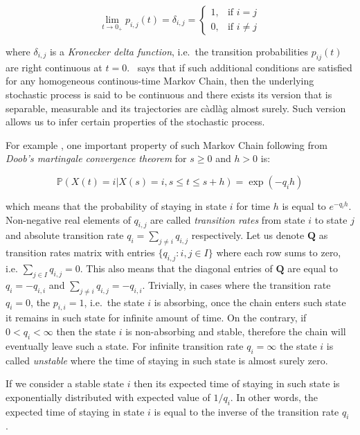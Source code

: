 \begin{equation}
    \lim_{t \to 0_{+}} p_{i,j}(t) = \delta_{i,j} = 
        \begin{cases}
            1, & \text{if } i = j\\
            0, & \text{if } i \neq j
        \end{cases}
\end{equation}

where $\delta_{i,j}$ is a \textit{Kronecker delta function}, i.e.\ the transition probabilities $p_{ij}(t)$ are right continuous at $t=0$.~\citep{Norris2012} says that if such additional conditions are satisfied for any homogeneous continous-time Markov Chain, 
then the underlying stochastic process is said to be continuous and there exists its version that is separable, measurable and its trajectories are càdlàg almost surely. Such version allows us to infer 
certain properties of the stochastic process.

For example \citep{Gidi2018}, one important property of such Markov Chain following from \textit{Doob's martingale convergence theorem} for $s \geq 0$ and $h>0$ is:

\begin{equation}
    \mathbb{P}(X(t) = i|X(s)=i, s \leq t \leq s+h) = \exp(-{q_i}h)
\end{equation}

which means that the probability of staying in state $i$ for time $h$ is equal to $e^{-{q_i}h}$. 
Non-negative real elements of $q_{i,j}$ are called \textit{transition rates} from state $i$ to state $j$ and absolute transition 
rate $q_i = \sum_{j \neq i} q_{i,j}$ respectively. Let us denote $\textbf{Q}$ as transition rates matrix with entries $\{q_{i,j}: i,j \in I\}$ where each row sums to zero, i.e. $\sum_{j \in I} q_{i,j} = 0$. 
This also means that the diagonal entries of $\textbf{Q}$ are equal to $q_i = -q_{i,i}$ and $\sum_{j \neq i} q_{i,j} = -q_{i,i}$. 
Trivially, in cases where the transition rate $q_i=0$, the $p_{i,i} = 1$, i.e.\ the state $i$ is absorbing, 
once the chain enters such state it remains in such state for infinite amount of time. On the contrary, if $0 < q_i < \infty$ then the state $i$ is non-absorbing and stable, therefore
the chain will eventually leave such a state. For infinite transition rate $q_i = \infty$ the state $i$ is called \textit{unstable} where the time of staying in such state is almost surely zero.~\citep{Praskova2012}

If we consider a stable state $i$ then its expected time of staying in such state is exponentially 
distributed with expected value of $1/q_i$. In other words, the expected time of staying in state $i$ is equal 
to the inverse of the transition rate $q_i$.~\citep{Norris2012}

